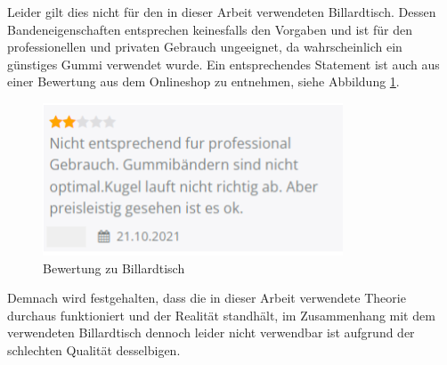 Leider gilt dies nicht für den in dieser Arbeit verwendeten Billardtisch.
Dessen Bandeneigenschaften entsprechen keinesfalls den Vorgaben und ist für den professionellen und privaten Gebrauch ungeeignet,
da wahrscheinlich ein günstiges Gummi verwendet wurde.
Ein entsprechendes Statement ist auch aus einer Bewertung aus dem Onlineshop zu entnehmen, siehe Abbildung \ref{fig:bewertung_billardtisch}.

\begin{figure}[h!]
    \begin{center}
        \includegraphics[width=0.3\linewidth]{../common/04_results/resources/simulation/00_bewertung_billardtisch.png}
    \end{center}
    \caption{Bewertung zu Billardtisch\cite{gonser:billardtisch}}
    \label{fig:bewertung_billardtisch}
\end{figure}

Demnach wird festgehalten, dass die in dieser Arbeit verwendete Theorie durchaus funktioniert und der Realität
standhält, im Zusammenhang mit dem verwendeten Billardtisch dennoch leider nicht verwendbar ist aufgrund der schlechten
Qualität desselbigen.
